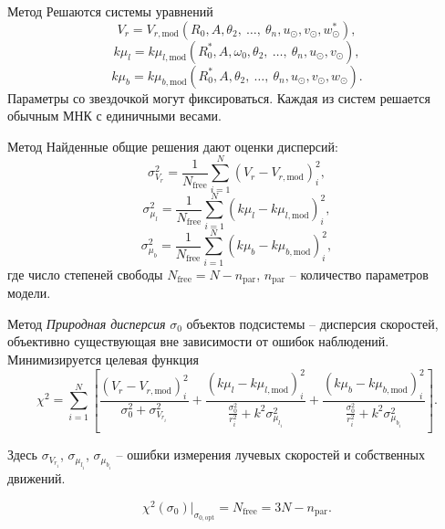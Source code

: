 \documentclass{beamer}
\begin{document}
\begin{frame}{Метод}
	Решаются системы уравнений
	\begin{equation}
                V_r = V_{r, \mathrm{mod}} (R_0, A, \theta_2, \:\ldots,\: \theta_n, u_{\odot}, v_{\odot}, w_{\odot}^{*}),
	\end{equation}
	\begin{equation}
                k\mu_l = k\mu_{l, \mathrm{mod}} (R_0^{*}, A, \omega_0, \theta_2, \:\ldots,\: \theta_n, u_{\odot}, v_{\odot}),
	\end{equation}
	\begin{equation}
                k\mu_b = k\mu_{b, \mathrm{mod}} (R_0^{*}, A, \theta_2, \:\ldots,\: \theta_n, u_{\odot}, v_{\odot}, w_{\odot}).
	\end{equation}
        Параметры со звездочкой могут фиксироваться. Каждая из систем решается обычным МНК с единичными весами.
\end{frame}

\begin{frame}{Метод}
Найденные общие решения дают оценки дисперсий:
	\begin{equation}
                \sigma^2_{V_r} = \frac{1}{N_{\mathrm{free}}} \sum^N_{i = 1} \left( V_r - V_{r, \mathrm{mod}} \right)^2_i,
	\end{equation}
	\begin{equation}
                \sigma^2_{\mu_l} = \frac{1}{N_{\mathrm{free}}} \sum^N_{i = 1} \left( k\mu_l - k\mu_{l, \mathrm{mod}} \right)^2_i,
	\end{equation}
	\begin{equation}
                \sigma^2_{\mu_b} = \frac{1}{N_{\mathrm{free}}} \sum^N_{i = 1} \left( k\mu_b - k\mu_{b, \mathrm{mod}} \right)^2_i,
	\end{equation}
        где число степеней свободы $N_{\mathrm{free}} = N - n_{\mathrm{par}}$, $n_{\mathrm{par}}$ -- количество параметров модели.
\end{frame}

\begin{frame}{Метод}
\textit{Природная дисперсия} $\sigma_0$ объектов подсистемы -- дисперсия скоростей, объективно существующая вне зависимости от ошибок наблюдений. Минимизируется целевая функция
\begin{equation} \label{chi_sq_func}
        \chi^2 = \sum^N_{i = 1} \left[ \frac{\left( V_r - V_{r, \mathrm{mod}} \right)^2_i}{\sigma_0^2 + \sigma^2_{V_{r_i}}} + \frac{\left(k \mu_l - k\mu_{l, \mathrm{mod}} \right)^2_i}{\frac{\sigma_0^2}{r_i^2} + k^2\sigma^2_{\mu_{l_i}}} + \frac{\left(k \mu_b - k\mu_{b, \mathrm{mod}} \right)^2_i}{\frac{\sigma_0^2}{r_i^2} + k^2\sigma^2_{\mu_{b_i}}} \right].
\end{equation}

\par Здесь $\sigma_{V_{r_i}}$, $\sigma_{\mu_{l_i}}$, $\sigma_{\mu_{b_i}}$ -- ошибки измерения лучевых скоростей и собственных движений.

\begin{equation}
        \chi^2(\sigma_0) |_{\sigma_{0, \mathrm{opt}}} = N_{\mathrm{free}} = 3 N - n_{\mathrm{par}}.
\end{equation}
\end{frame}
\end{document}
